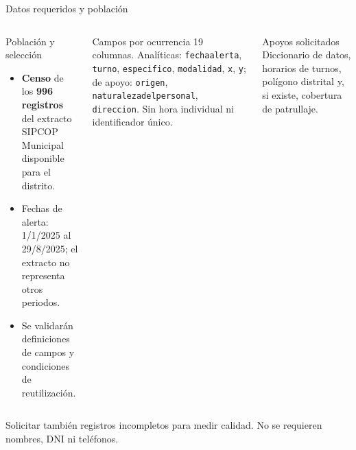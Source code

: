 \documentclass[aspectratio=169,10pt]{beamer}
\begin{document}
\begin{frame}{Datos requeridos y población}
  \begin{columns}[T,onlytextwidth]
      \begin{block}{Población y selección}
        \begin{itemize}
          \item \textbf{Censo} de los \textbf{996 registros} del extracto SIPCOP Municipal disponible para el distrito.
          \item Fechas de alerta: 1/1/2025 al 29/8/2025; el extracto no representa otros periodos.
          \item Se validarán definiciones de campos y condiciones de reutilización.
        \end{itemize}
      \end{block}
      \begin{block}{Campos por ocurrencia}
        19 columnas. Analíticas: \texttt{fechaalerta}, \texttt{turno}, \texttt{especifico}, \texttt{modalidad}, \texttt{x}, \texttt{y}; de apoyo: \texttt{origen}, \texttt{naturalezadelpersonal}, \texttt{direccion}. Sin hora individual ni identificador único.
      \end{block}
      \begin{block}{Apoyos solicitados}
        Diccionario de datos, horarios de turnos, polígono distrital y, si existe, cobertura de patrullaje.
      \end{block}
  \end{columns}
  \vspace{.12cm}
  \footnotesize Solicitar también registros incompletos para medir calidad. No se requieren nombres, DNI ni teléfonos.
\end{frame}
\end{document}
